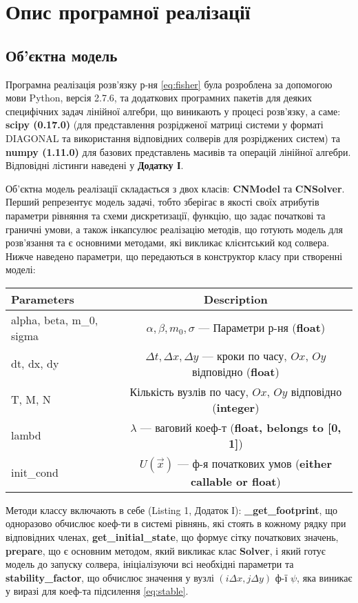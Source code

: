\section{Опис програмної реалізації}
\subsection{Об’єктна модель}
Програмна реалізація розв’язку р-ня \eqref{eq:fisher} була розроблена за допомогою мови Python, версія 2.7.6, та додаткових програмних пакетів для деяких специфічних задач лінійної алгебри, що виникають у процесі розв’язку, а саме: \textbf{scipy (0.17.0)} (для представлення розрідженої матриці системи у форматі DIAGONAL та використання відповідних солверів для розріджених систем) та \textbf{numpy (1.11.0)} для базових представлень масивів та операцій лінійної алгебри. Відповідні лістинги наведені у \textbf{Додатку І}.

Об’єктна модель реалізації складається з двох класів: \textbf{CNModel} та \textbf{CNSolver}.
Перший репрезентує модель задачі, тобто зберігає в якості своїх атрибутів параметри рівняння та схеми дискретизації, функцію, що задає початкові та граничні умови, а також інкапсулює реалізацію методів, що готують модель для розв’язання та є основними методами, які викликає клієнтський код солвера.
Нижче наведено параметри, що передаються в конструктор класу при створенні моделі:
\vspace{10pt}
\begin{center}
	\begin{tabular}{|l|c|}
	\hline
	Parameters & Description \\ \hline
	alpha, beta, m\_0, sigma & $\alpha, \beta, m_0, \sigma$ --- Параметри р-ня (\textbf{float}) \\ \hline
	dt, dx, dy & $\Delta t, \Delta x, \Delta y$ --- кроки по часу, $Ox$, $Oy$ відповідно (\textbf{float})  \\ \hline
	T, M, N & Кількість вузлів по часу, $Ox$, $Oy$ відповідно (\textbf{integer}) \\ \hline
	lambd & $\lambda$ --- ваговий коеф-т (\textbf{float, belongs to [0, 1]}) \\ \hline
	init\_cond & $U(\vec{x})$ --- ф-я початкових умов (\textbf{either callable or float}) \\ \hline
	\end{tabular}
\end{center}
\vspace{10pt}
Методи классу включають в себе (Listing 1, Додаток І): \textbf{\_get\_footprint}, що одноразово обчислює коеф-ти в системі рівнянь, які стоять в кожному рядку при відповідних членах, \textbf{get\_initial\_state}, що формує сітку початкових значень, \textbf{prepare}, що є основним методом, який викликає клас \textbf{Solver}, і який готує модель до запуску солвера, ініціалізуючи всі необхідні параметри та \textbf{stability\_factor}, що обчислює значення у вузлі $(i\Delta x, j\Delta y)$ ф-ї $\psi$, яка виникає у виразі для коеф-та підсилення \eqref{eq:stable}.

